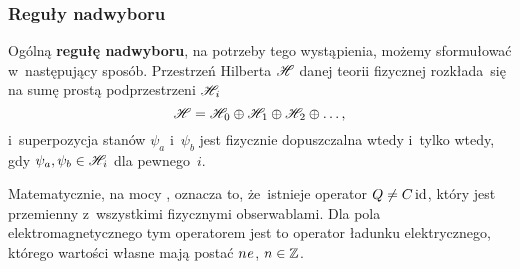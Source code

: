 \documentclass[10pt,t]{beamer}
\begin{document}
\begin{frame}
  \frametitle{Reguły nadwyboru}


  Ogólną \textbf{regułę nadwyboru}, na potrzeby tego wystąpienia, możemy
  sformułować w~następujący sposób. Przestrzeń Hilberta $\mathcal{H}$ danej
  teorii fizycznej
  rozkłada~się na sumę prostą podprzestrzeni $\mathcal{H}_{ \hspace{0.07em} i }$
  \begin{equation}
    \label{eq:Glowne-rodzaje-problemow-podczerwonych-03}
    \mathcal{H} =
    \mathcal{H}_{ \hspace{0.07em} 0 } \oplus \mathcal{H}_{ \hspace{0.07em} 1 } \oplus
    \mathcal{H}_{ \hspace{0.07em} 2 } \oplus \ldots,
  \end{equation}
  i~superpozycja stanów $\psi_{ a }$ i~$\psi_{ b }$ jest fizycznie dopuszczalna
  wtedy i~tylko wtedy, gdy $\psi_{ a }, \psi_{ b } \in \mathcal{H}_{ \hspace{0.07em} i }$
  dla pewnego~$i$.

  Matematycznie, na mocy
  ,
  oznacza to, że~istnieje operator $Q \neq C \operatorname{id}$, który jest przemienny
  z~wszystkimi fizycznymi obserwablami. Dla pola elektromagnetycznego tym
  operatorem jest to operator ładunku elektrycznego, którego wartości własne
  mają postać $n \hspace{0.05em} e$, $n \in \mathbb{Z}$.

\end{frame}
\end{document}
